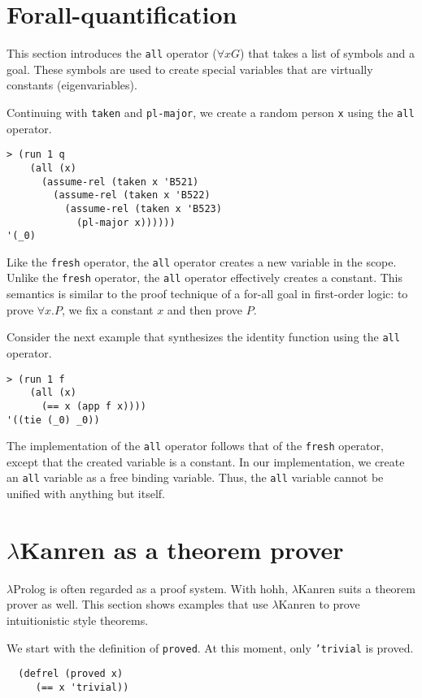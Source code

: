 \documentclass[acmlarge,review]{acmart}
\theoremstyle{definition}
\begin{document}
\section{Forall-quantification}
This section introduces the \texttt{all} operator ($\forall x G$) that takes
a list of symbols and a goal. These symbols are used to create special
variables that are virtually constants (eigenvariables).

Continuing with \texttt{taken} and \texttt{pl-major},
we create a random person \texttt{x} using the \texttt{all} operator.
\begin{lstlisting}
> (run 1 q
    (all (x)
      (assume-rel (taken x 'B521)
        (assume-rel (taken x 'B522)
          (assume-rel (taken x 'B523)
            (pl-major x))))))
'(_0)
\end{lstlisting}

Like the \texttt{fresh} operator, the \texttt{all} operator creates a new
variable in the scope. Unlike the \texttt{fresh} operator, the \texttt{all}
operator effectively creates a constant. This semantics is similar to the
proof technique of a for-all goal in first-order logic: to prove
$\forall x. P$, we fix a constant $x$ and then prove $P$.

Consider the next example that synthesizes the identity function using the
\texttt{all} operator. 
\begin{lstlisting}
> (run 1 f
    (all (x)
      (== x (app f x))))
'((tie (_0) _0))
\end{lstlisting}

The implementation of the \texttt{all} operator follows that of the
\texttt{fresh} operator, except that the created variable is a constant.
In our implementation, we create an \texttt{all} variable as a free
binding variable. Thus, the \texttt{all} variable cannot be unified
with anything but itself.

\section{$\lambda$Kanren as a theorem prover}
$\lambda$Prolog is often regarded as a proof system. With hohh,
$\lambda$Kanren suits a theorem prover as well.
This section shows examples that use $\lambda$Kanren to prove
intuitionistic style theorems.

We start with the definition of \texttt{proved}. At this moment,
only \texttt{'trivial} is proved.
\begin{lstlisting}
  (defrel (proved x)
     (== x 'trivial))
\end{lstlisting}
\end{document}
